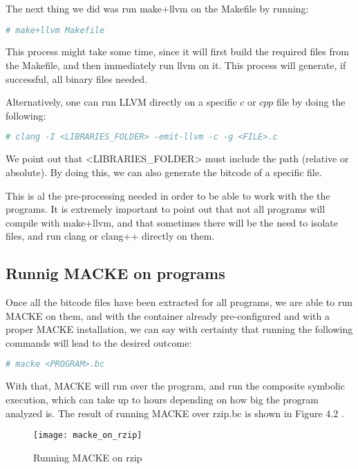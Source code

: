 The next thing we did was run make+llvm on the Makefile by running:

\begin{lstlisting}[language=bash]
# make+llvm Makefile
\end{lstlisting}

This process might take some time, since it will first build the required files from the Makefile, and then immediately run llvm on it. This process will generate, if successful, all binary files needed.

Alternatively, one can run LLVM directly on a specific $c$ or $cpp$ file by doing the following:

\begin{lstlisting}[language=bash]
# clang -I <LIBRARIES_FOLDER> -emit-llvm -c -g <FILE>.c
\end{lstlisting}

We point out that <LIBRARIES\_FOLDER> must include the path (relative or absolute). By doing this, we can also generate the bitcode of a specific file.

This is al the pre-processing needed in order to be able to work with the the programs. It is extremely important to point out that not all programs will compile with make+llvm, and that sometimes there will be the need to isolate files, and run clang or clang++ directly on them.

\subsection{Runnig MACKE on programs}

Once all the bitcode files have been extracted for all programs, we are able to run MACKE on them, and with the container already pre-configured and with a proper MACKE installation, we can say with certainty that running the following commands will lead to the desired outcome:

\begin{lstlisting}[language=bash]
# macke <PROGRAM>.bc
\end{lstlisting}

With that, MACKE will run over the program, and run the composite symbolic execution, which can take up to hours depending on how big the program analyzed is. The result of running MACKE over rzip.bc is shown in Figure 4.2 .

\begin{figure}[H]
	\caption{Running MACKE on rzip}
	\centering
	\texttt{[image: macke\_on\_rzip]}
\end{figure}

